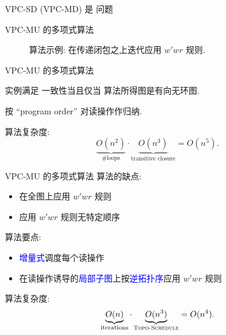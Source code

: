 \begin{frame}{VPC-SD (VPC-MD) 是 \npc{} 问题}
\end{frame}
\begin{frame}{VPC-MU 的多项式算法 \rwclosure{}}
  \begin{figure}[h!]
    \centering
    \begin{adjustbox}{max totalsize = {0.60\textwidth}{1.00\textheight}, center}
	  
    \end{adjustbox}
	\caption{\rwclosure{} 算法示例: 在传递闭包之上迭代应用 $w'wr$ 规则.}
  \end{figure}

\end{frame}
\begin{frame}{VPC-MU 的多项式算法 \rwclosure{}}
  \begin{ctheorem}
	 实例满足 \PRAM{} 一致性当且仅当 \rwclosure{} 算法所得图是有向无环图.
  \end{ctheorem}

  \pause 

  \begin{cproof}
    按 ``program order'' 对读操作作归纳.
  \end{cproof}

  \pause
  \vspace{0.60cm}

  \rwclosure{} 算法复杂度: 
  \[
    \underbrace{O(n^2)}_{\textrm{\#loops}} \cdot
	\underbrace{O(n^3)}_{\textrm{transitive closure}}  = O(n^5).
  \]
\end{frame}
\begin{frame}{VPC-MU 的多项式算法 \readcentric{}}
  \rwclosure{} 算法的缺点:
  \begin{itemize}
	\item 在全图上应用 $w'wr$ 规则
	\item 应用 $w'wr$ 规则无特定顺序
  \end{itemize}

  \pause
  \vspace{0.50cm}

  \readcentric{} 算法要点:
  \begin{itemize}
	\item \textcolor{blue}{增量式}调度每个读操作
	\item 在读操作诱导的\textcolor{blue}{局部子图}上按\textcolor{blue}{逆拓扑序}应用 $w'wr$ 规则
  \end{itemize}

  \pause
  \vspace{0.60cm}
  \rwclosure{} 算法复杂度: 
  \[
    \underbrace{O(n)}_{\textrm{iterations}} \cdot
	\underbrace{O(n^3)}_{\textsc{Topo-Schedule}} = O(n^4).
  \]
\end{frame}
